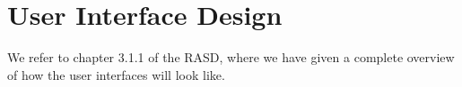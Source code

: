 \chapter{User Interface Design}
We refer to chapter 3.1.1 of the RASD, where we have given a complete overview of how the user interfaces will look like.